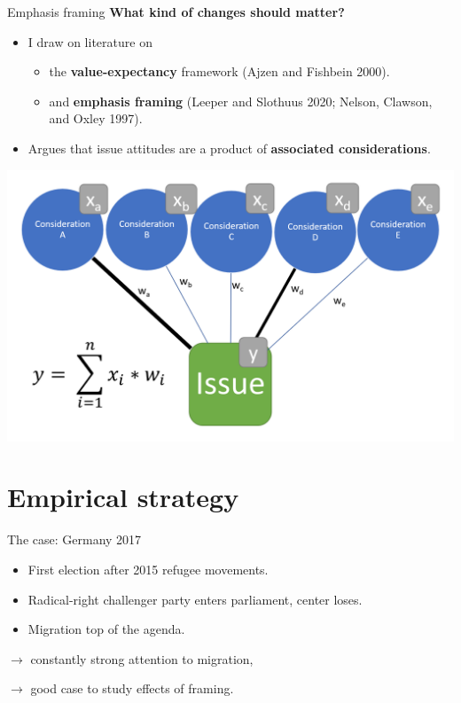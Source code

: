 \documentclass[
  ignorenonframetext,
]{beamer}
\providecommand{\tightlist}{%
  \setlength{\itemsep}{0pt}\setlength{\parskip}{0pt}}
\begin{document}
\begin{frame}[allowframebreaks]{Emphasis framing}
\protect\hypertarget{emphasis-framing}{}
\textbf{What kind of changes should matter?}

\begin{itemize}
\tightlist
\item
  I draw on literature on

  \begin{itemize}
  \tightlist
  \item
    the \textbf{value-expectancy} framework (Ajzen and Fishbein 2000).
  \item
    and \textbf{emphasis framing} (Leeper and Slothuus 2020; Nelson,
    Clawson, and Oxley 1997).
  \end{itemize}
\item
  Argues that issue attitudes are a product of \textbf{associated
  considerations}.
\end{itemize}

\framebreak

\includegraphics{vis/CognitiveStorage.png}
\end{frame}

\hypertarget{empirical-strategy}{%
\section{Empirical strategy}\label{empirical-strategy}}

\begin{frame}{The case: Germany 2017}
\protect\hypertarget{the-case-germany-2017}{}
\begin{itemize}
\tightlist
\item
  First election after 2015 refugee movements.
\item
  Radical-right challenger party enters parliament, center loses.
\item
  Migration top of the agenda.
\end{itemize}

\(\rightarrow\) constantly strong attention to migration,

\(\rightarrow\) good case to study effects of framing.
\end{frame}
\end{document}
